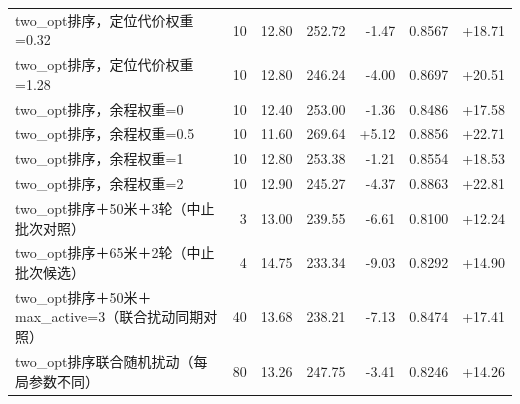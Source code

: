 \begin{longtable}{p{}rrrrrr}
two\_opt排序，定位代价权重=0.32 & 10 & 12.80 & 252.72 & -1.47 & 0.8567 & +18.71 \\
two\_opt排序，定位代价权重=1.28 & 10 & 12.80 & 246.24 & -4.00 & 0.8697 & +20.51 \\
two\_opt排序，余程权重=0 & 10 & 12.40 & 253.00 & -1.36 & 0.8486 & +17.58 \\
two\_opt排序，余程权重=0.5 & 10 & 11.60 & 269.64 & +5.12 & 0.8856 & +22.71 \\
two\_opt排序，余程权重=1 & 10 & 12.80 & 253.38 & -1.21 & 0.8554 & +18.53 \\
two\_opt排序，余程权重=2 & 10 & 12.90 & 245.27 & -4.37 & 0.8863 & +22.81 \\
two\_opt排序＋50米＋3轮（中止批次对照） & 3 & 13.00 & 239.55 & -6.61 & 0.8100 & +12.24 \\
two\_opt排序＋65米＋2轮（中止批次候选） & 4 & 14.75 & 233.34 & -9.03 & 0.8292 & +14.90 \\
two\_opt排序＋50米＋max\_active=3（联合扰动同期对照） & 40 & 13.68 & 238.21 & -7.13 & 0.8474 & +17.41 \\
two\_opt排序联合随机扰动（每局参数不同） & 80 & 13.26 & 247.75 & -3.41 & 0.8246 & +14.26 \\
\end{longtable}\endgroup
